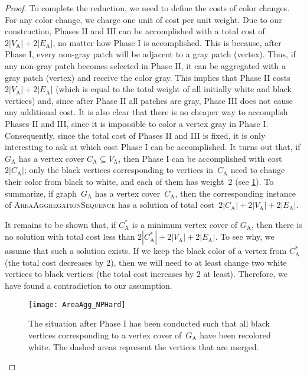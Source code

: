 \documentclass[acmsmall,natbib=false]{acmart}
\begin{document}
\begin{proof}
To complete the reduction, 
we need to define the costs of color changes. 
For any color change, 
we charge one unit of cost per unit weight.
Due to our construction, Phases II and III can be accomplished with
a total cost of~$2|V_\mathrm{A}|+2|E_\mathrm{A}|$, 
no matter how Phase I is accomplished.
This is because, after Phase I, 
every non-gray patch will be adjacent to a gray patch (vertex).
Thus, if any non-gray patch becomes selected in Phase II, 
it can be aggregated with a gray patch (vertex) and 
receive the color gray. 
This implies that Phase II costs $2|V_\mathrm{A}|+2|E_\mathrm{A}|$ 
(which is equal to the total weight of 
all initially white and black vertices) and, 
since after Phase II all patches are gray, 
Phase III does not cause any additional cost.  
It is also clear that 
there is no cheaper way to accomplish Phases II and III,
since it is impossible to color a vertex gray in Phase I.
Consequently, since the total cost of Phases II and III is fixed, 
it is only interesting to ask 
at which cost Phase I can be accomplished.
It turns out that, if $G_\mathrm{A}$ 
has a vertex cover $C_\mathrm{A} \subseteq V_\mathrm{A}$, 
then Phase I can be accomplished with cost $2|C_\mathrm{A}|$;
only the black vertices corresponding to vertices in~$C_\mathrm{A}$ 
need to change their color from black to white, and 
each of them has weight~$2$ (see \fig\ref{fig:reduction2}).
To summarize, if graph~$G_\mathrm{A}$ has a vertex cover~$C_\mathrm{A}$, 
then the corresponding instance of \textsc{AreaAggregationSequence} 
has a solution of 
total cost~$2|C_\mathrm{A}|+2|V_\mathrm{A}|+2|E_\mathrm{A}|$.

It remains to be shown that, 
if $C_\mathrm{A}^*$ is a minimum vertex cover of $G_\mathrm{A}$, 
then there is no solution with total cost 
less than $2|C_\mathrm{A}^*|+2|V_\mathrm{A}|+2|E_\mathrm{A}|$.
To see why, we assume that such a solution exists.
If we keep the black color of a vertex from $C_\mathrm{A}^*$ 
(the total cost decreases by $2$),
then we will need to at least change two white vertices
to black vertices
(the total cost increases by $2$ at least).
Therefore, we have found a contradiction to our assumption.

\begin{figure}[tb]
\centering
\texttt{[image: AreaAgg\_NPHard]}
\caption{The situation after Phase I has been conducted 
    such that all black vertices corresponding to a vertex cover 
    of~$G_\mathrm{A}$ have been recolored white.
    The dashed areas represent the vertices that are merged.}
\label{fig:reduction2}
\end{figure}
\end{proof}
\end{document}
